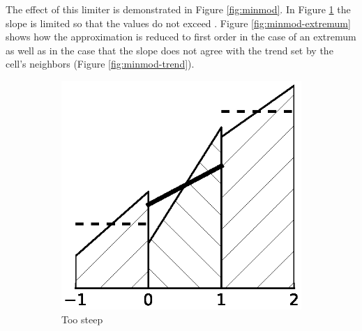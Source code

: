 The effect of this limiter  is demonstrated in Figure \ref{fig:minmod}.
In Figure \ref{fig:minmod-steep} the slope is limited so that the values  do not exceed .
Figure \ref{fig:minmod-extremum} shows how the approximation is reduced to first order in the case of an extremum as well as in the case that the slope does not agree with the trend set by the cell's neighbors (Figure \ref{fig:minmod-trend}).
\begin{figure}
  \centering
  \begin{subfigure}{0.27\textwidth}
    \centering
    \includegraphics[width=\textwidth]{figures/minmod-a}
    \caption{Too steep}
    \label{fig:minmod-steep}
  \end{subfigure}
  \hfill
  \begin{subfigure}{0.27\textwidth}
    \centering

\end{subfigure}
\end{figure}

